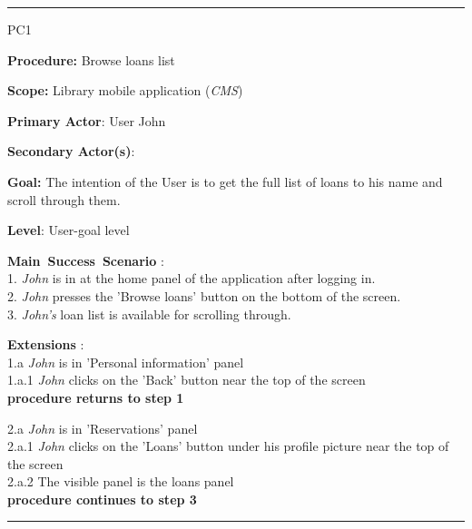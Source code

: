 \vspace{0.5cm}
\hrule
\begin{lyxlist}{PC1}
\small{
\item [\textbf{Procedure:}] Browse loans list
\item [\textbf{Scope:}] Library mobile application (\emph{CMS})
\item [\textbf{Primary Actor}:] User John
\item [\textbf{Secondary Actor(s)}:] 
\item [\textbf{Goal:}] The intention of the User is to get the full list of
loans to his name and scroll through them.
\item [\textbf{Level}:] User-goal level
\item [\textbf{Main~Success~Scenario}]:\\
1. \emph{John} is in at the home panel of the application after logging in.\\
2. \emph{John} presses the 'Browse loans' button on the bottom of the screen.\\
3. \emph{John's} loan list is available for scrolling through.\\

\item [\textbf{Extensions}]:\\
1.a \emph{John} is in 'Personal information' panel\\
\hspace*{0.5cm} 1.a.1 \emph{John} clicks on the 'Back' button near the top of
the screen\\
\hspace*{0.5cm} \textbf{procedure returns to step 1}

2.a \emph{John} is in 'Reservations' panel\\
\hspace*{0.5cm} 2.a.1 \emph{John} clicks on the 'Loans' button under his
profile picture near the top of the screen\\
\hspace*{0.5cm} 2.a.2 The visible panel is the loans panel\\
\hspace*{0.5cm} \textbf{procedure continues to step 3}

}

\end{lyxlist}
\hrule


